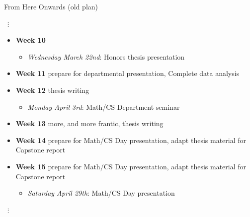 \begin{frame}{From Here Onwards (old plan)}
\begin{center}
{\centering ~$\bm{\vdots}$~}
\end{center}
\begin{itemize}
 \item \textbf{Week 10}
  \begin{itemize}
    \item \textit{Wednesday March 22nd}: Honors thesis presentation
  \end{itemize}
  \item \textbf{Week 11} prepare for departmental presentation, Complete data analysis
  \item \textbf{Week 12} thesis writing \Coffeecup \Coffeecup \Coffeecup
  \begin{itemize}
    \item \textit{Monday April 3rd}: Math/CS Department seminar
  \end{itemize}
  \item \textbf{Week 13}  more, and more frantic, thesis writing \Coffeecup \Coffeecup \Coffeecup \Coffeecup \Coffeecup
  \item \textbf{Week 14} prepare for Math/CS Day presentation, adapt thesis material for Capstone report
  \item \textbf{Week 15} prepare for Math/CS Day presentation, adapt thesis material for Capstone report
  \begin{itemize}
  	\item \textit{Saturday April 29th}: Math/CS Day presentation
  \end{itemize}
 \end{itemize}
\vspace{-1ex}
\begin{center}
{\centering ~$\bm{\vdots}$~}
\end{center}
\end{frame}

